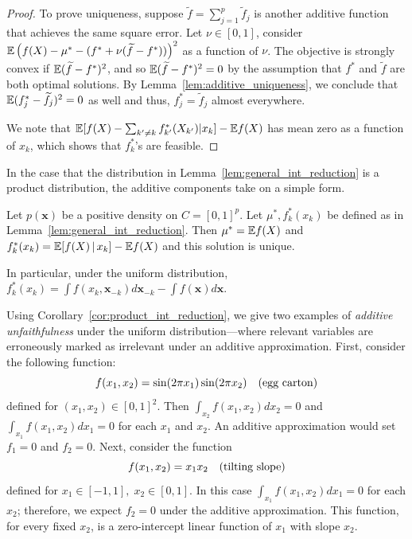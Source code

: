 \begin{proof}
To prove uniqueness, suppose $\tilde{f} = \sum_{j=1}^p \tilde{f}_j$ is another additive function that achieves the same square error. Let $\nu \in [0,1]$, consider ${\mathbb E}\left( f(X) - \mu^* - (f^* + \nu (\widetilde{f} - f^*)) \right)^2$ as a function of $\nu$. The objective is strongly convex if ${\mathbb E} (\widetilde{f} - f^*)^2$, and so ${\mathbb E}( \widetilde{f} - f^*)^2 = 0$ by the assumption that $f^*$ and $\tilde{f}$ are both optimal solutions. By Lemma~\ref{lem:additive_uniqueness}, we conclude that ${\mathbb E}( f^*_j - \widetilde{f}_j )^2 = 0$ as well and thus, $f^*_j = \tilde{f}_j$ almost everywhere.

We note that ${\mathbb E}[ f(X) -\sum_{k'\neq k} f^*_{k'}(X_{k'}) | x_k] - {\mathbb E} f(X)$ has mean zero as a function of $x_k$, which shows that $f^*_k$'s are feasible. 

\end{proof} 

In the case that the distribution in
Lemma~\ref{lem:general_int_reduction} is a product distribution, 
the additive components take on a simple form.

\begin{corollary}
\label{cor:product_int_reduction}
Let $p(\mathbf{x})$ be a positive density on $C=[0,1]^p$.
Let $\mu^*, f^*_k(x_k)$ be defined as in Lemma~\ref{lem:general_int_reduction}.
Then $\mu^* = {\mathbb E} f(X)$ and $f^*_k(x_k) = {\mathbb E}[ f(X) {\,|\,} x_k] - {\mathbb E} f(X)$ and this solution is unique.
\end{corollary}

In particular, under the uniform distribution, $f^*_k(x_k) = \displaystyle\int f(x_k, \mathbf{x}_{-k}) d\mathbf{x}_{-k} - \int f(\mathbf{x}) d\mathbf{x}$.


\begin{example} Using Corollary~\ref{cor:product_int_reduction}, we
  give two examples of \emph{additive unfaithfulness} under the
  uniform distribution---where relevant variables are
  erroneously marked as irrelevant under an additive
  approximation. First, consider the following function:
\begin{equation}
f(x_1, x_2) = \sin( 2\pi x_1) \sin( 2 \pi x_2)\quad
\textrm{(egg carton)} 
\end{equation}
defined for $(x_1, x_2) \in [0,1]^2$.  Then
$\displaystyle\int_{x_2} f(x_1, x_2) d x_2 = 0$ and
$\displaystyle\int_{x_1} f(x_1, x_2) d x_1 = 0$ for each $x_1$ and $x_2$. An additive approximation
would set $f_1 = 0$ and $f_2 = 0$.  Next, consider the function
\begin{equation}
f(x_1, x_2) = x_1 x_2 \quad \textrm{(tilting slope)} 
\end{equation}
defined for $x_1 \in [-1,1],\; x_2 \in [0,1]$.  In this case
$\displaystyle\int_{x_1} f(x_1, x_2) d x_1 = 0$ for each $x_2$; therefore, we expect $f_2 = 0$ under the additive approximation. This function, for every fixed $x_2$, is a zero-intercept linear function of $x_1$ with slope $x_2$.
\end{example}

